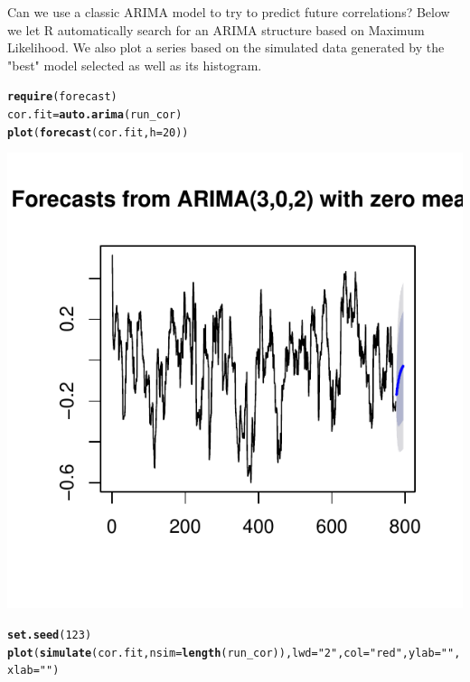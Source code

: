 \documentclass[10pt]{article}\usepackage[]{graphicx}\usepackage[]{color}
\makeatletter
\def\maxwidth{ %
  \ifdim\Gin@nat@width>\linewidth
    \linewidth
  \else
    \Gin@nat@width
  \fi
}
\newcommand{\hlnum}[1]{\textcolor[rgb]{0.686,0.059,0.569}{#1}}%
\newcommand{\hlstr}[1]{\textcolor[rgb]{0.192,0.494,0.8}{#1}}%
\newcommand{\hlstd}[1]{\textcolor[rgb]{0.345,0.345,0.345}{#1}}%
\newcommand{\hlkwb}[1]{\textcolor[rgb]{0.69,0.353,0.396}{#1}}%
\newcommand{\hlkwc}[1]{\textcolor[rgb]{0.333,0.667,0.333}{#1}}%
\newcommand{\hlkwd}[1]{\textcolor[rgb]{0.737,0.353,0.396}{\textbf{#1}}}%
\newenvironment{kframe}{%
 \def\at@end@of@kframe{}%
 \ifinner\ifhmode%
  \def\at@end@of@kframe{\end{minipage}}%
  \begin{minipage}{\columnwidth}%
 \fi\fi%
 \def\FrameCommand##1{\hskip\@totalleftmargin \hskip-\fboxsep
 \colorbox{shadecolor}{##1}\hskip-\fboxsep
     \hskip-\linewidth \hskip-\@totalleftmargin \hskip\columnwidth}%
 \MakeFramed {\advance\hsize-\width
   \@totalleftmargin\z@ \linewidth\hsize
   \@setminipage}}%
 {\par\unskip\endMakeFramed%
 \at@end@of@kframe}
\newenvironment{knitrout}{}{} %
\makeatother
\begin{document}
Can we use a classic ARIMA model to try to predict future correlations? Below we let R automatically search for an ARIMA structure based on Maximum Likelihood. We also plot a series based on the simulated data generated by the "best" model selected as well as its histogram.
\begin{knitrout}
\color{fgcolor}\begin{kframe}
\begin{alltt}
\hlkwd{require}\hlstd{(forecast)}
\hlstd{cor.fit} \hlkwb{=} \hlkwd{auto.arima}\hlstd{(run_cor)}
\hlkwd{plot}\hlstd{(}\hlkwd{forecast}\hlstd{(cor.fit,} \hlkwc{h} \hlstd{=} \hlnum{20}\hlstd{))}
\end{alltt}
\end{kframe}

{\centering \includegraphics[width=\maxwidth]{figure/unnamed-chunk-201} 

}


\begin{kframe}\begin{alltt}
\hlkwd{set.seed}\hlstd{(}\hlnum{123}\hlstd{)}
\hlkwd{plot}\hlstd{(}\hlkwd{simulate}\hlstd{(cor.fit,} \hlkwc{nsim} \hlstd{=} \hlkwd{length}\hlstd{(run_cor)),} \hlkwc{lwd} \hlstd{=} \hlstr{"2"}\hlstd{,} \hlkwc{col} \hlstd{=} \hlstr{"red"}\hlstd{,} \hlkwc{ylab} \hlstd{=} \hlstr{""}\hlstd{,}
    \hlkwc{xlab} \hlstd{=} \hlstr{""}\hlstd{)}
\end{alltt}
\end{kframe}


\end{knitrout}
\end{document}
